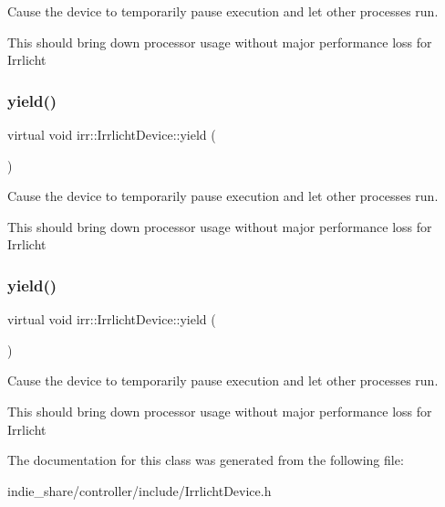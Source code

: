 Cause the device to temporarily pause execution and let other processes run. 

This should bring down processor usage without major performance loss for Irrlicht \mbox{\label{classirr_1_1IrrlichtDevice_a731727774fad9fc4c6c1c85277ca36dc}} 
\subsubsection{\texorpdfstring{yield()}{yield()}\hspace{0.1cm}{\footnotesize\ttfamily [2/3]}}
{\footnotesize\ttfamily virtual void irr\+::\+Irrlicht\+Device\+::yield (\begin{DoxyParamCaption}{ }\end{DoxyParamCaption})\hspace{0.3cm}{\ttfamily [pure virtual]}}



Cause the device to temporarily pause execution and let other processes run. 

This should bring down processor usage without major performance loss for Irrlicht \mbox{\label{classirr_1_1IrrlichtDevice_a731727774fad9fc4c6c1c85277ca36dc}} 
\subsubsection{\texorpdfstring{yield()}{yield()}\hspace{0.1cm}{\footnotesize\ttfamily [3/3]}}
{\footnotesize\ttfamily virtual void irr\+::\+Irrlicht\+Device\+::yield (\begin{DoxyParamCaption}{ }\end{DoxyParamCaption})\hspace{0.3cm}{\ttfamily [pure virtual]}}



Cause the device to temporarily pause execution and let other processes run. 

This should bring down processor usage without major performance loss for Irrlicht 

The documentation for this class was generated from the following file\+:\begin{DoxyCompactItemize}
\item 
indie\+\_\+share/controller/include/Irrlicht\+Device.\+h\end{DoxyCompactItemize}
